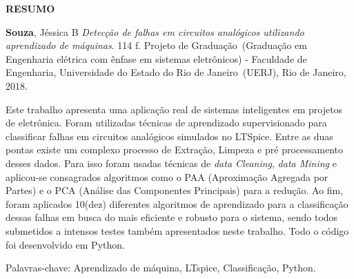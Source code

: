 \begin{center}
\textbf{RESUMO}
\end{center}

%
%

$\!$\\

\hspace{-1.3cm}\textbf{Souza}, Jéssica B \textit{Detecção de falhas em circuitos analógicos utilizando aprendizado de máquinas}. 114 f. Projeto de Graduação~(Graduação em Engenharia elétrica com ênfase em sistemas eletrônicos) - Faculdade de Engenharia, Universidade do Estado do Rio de Janeiro~(UERJ), Rio de Janeiro, 2018.

\vspace{.2cm}

Este trabalho apresenta uma aplicação real de sistemas inteligentes em projetos de eletrônica. Foram utilizadas técnicas de aprendizado supervisionado para classificar falhas em circuitos analógicos simulados no LTSpice. Entre as duas pontas existe um complexo processo de Extração, Limpeza e pré processamento desses dados. Para isso foram usadas técnicas de \textit{data Cleaning}, \textit{data Mining} e aplicou-se consagrados algoritmos como o PAA (Aproximação Agregada por Partes) e o PCA (Análise das Componentes Principais) para a redução. Ao fim, foram aplicados 10(dez) diferentes algoritmos de aprendizado para a classificação dessas falhas em busca do mais eficiente e robusto para o sistema, sendo todos submetidos a intensos testes também apresentados neste trabalho. Todo o código foi desenvolvido em Python.

\vspace{1cm}

\hspace{-1.3cm}Palavras-chave: Aprendizado de máquina, LTspice, Classificação, Python.